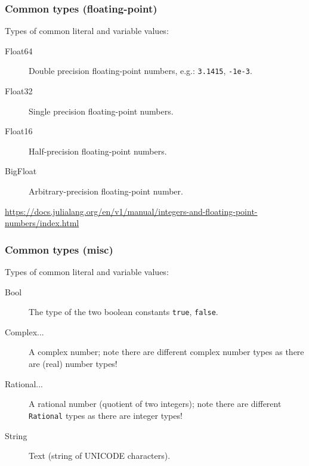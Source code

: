 \documentclass[english,serif,mathserif,xcolor=pdftex,dvipsnames,table]{beamer}
\begin{document}
\begin{frame}[fragile]
  \frametitle{Common types (floating-point)}

  Types of common literal and variable values:
  \begin{description}
  \item[Float64] Double precision floating-point numbers, e.g.:
    \texttt{3.1415}, \texttt{-1e-3}.
  \item[Float32] Single precision floating-point numbers.
  \item[Float16] Half-precision floating-point numbers.
  \item[BigFloat] Arbitrary-precision floating-point number.
  \end{description}

  \+
  \begin{references}
    \url{https://docs.julialang.org/en/v1/manual/integers-and-floating-point-numbers/index.html}
  \end{references}
\end{frame}


\begin{frame}[fragile]
  \frametitle{Common types (misc)}

  Types of common literal and variable values:
  \begin{description}
  \item[Bool] The type of the two boolean constants \texttt{true}, \texttt{false}.
  \item[Complex{...}] A complex number; note there are different
    complex number types as there are (real) number types!
  \item[Rational{...}] A rational number (quotient of two integers);
    note there are different \texttt{Rational} types as there are
    integer types!
  \item[String] Text (string of UNICODE characters).
  \end{description}
\end{frame}
\end{document}

